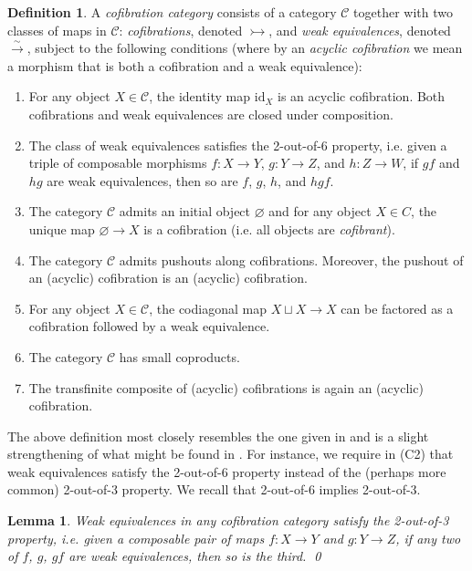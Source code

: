 \documentclass[11pt]{article}
\newtheorem{lemma}[theo]{Lemma}
\theoremstyle{definition}
\newtheorem{defi}[theo]{Definition}
\numberwithin{equation}{section}
\newcommand{\C}{\mathcal{C}}
\newcommand{\id}[1][]{\mathrm{id}_{#1}}
\newcommand{\weto}{\xrightarrow{\sim}}
\newcommand{\cto}{\rightarrowtail}
\newcommand{\from}{\colon}
\begin{document}
\begin{defi}\label{cofib-cat-def}
  A \emph{cofibration category} consists of a category $\C$ together with two classes of maps in $\C$: \emph{cofibrations}, denoted $\cto$, and \emph{weak equivalences}, denoted $\weto$, subject to the following conditions (where by an \emph{acyclic cofibration} we mean a morphism that is both a cofibration and a weak equivalence):
  \begin{enumerate}
      \item[(C1)] For any object $X \in \C$, the identity map $\id[X]$ is an acyclic cofibration.
      Both cofibrations and weak equivalences are closed under composition.
      \item[(C2)] The class of weak equivalences satisfies the 2-out-of-6 property, i.e. given a triple of composable morphisms $f \from X \to Y$, $g \from Y \to Z$, and $h \from Z \to W$, if $gf$ and $hg$ are weak equivalences, then so are $f$, $g$, $h$, and $hgf$.
      \item[(C3)] The category $\C$ admits an initial object $\varnothing$ and for any object $X \in C$, the unique map $\varnothing \to X$ is a cofibration (i.e. all objects are \emph{cofibrant}).
      \item[(C4)] The category $\C$ admits pushouts along cofibrations.
      Moreover, the pushout of an (acyclic) cofibration is an (acyclic) cofibration.
      \item[(C5)] For any object $X \in \C$, the codiagonal map $X \sqcup X \to X$ can be factored as a cofibration followed by a weak equivalence.
      \item[(C6)] The category $\C$ has small coproducts.
      \item[(C7)] The transfinite composite of (acyclic) cofibrations is again an (acyclic) cofibration.
  \end{enumerate}
\end{defi}

The above definition most closely resembles the one given in \cite{szumilo:two-models} and is a slight strengthening of what might be found in \cite{brown:abstract-homotopy-theory,baues:algebraic-homotopy}.
For instance, we require in (C2) that weak equivalences satisfy the 2-out-of-6 property instead of the (perhaps more common) 2-out-of-3 property.
We recall that 2-out-of-6 implies 2-out-of-3.

\begin{lemma}
  Weak equivalences in any cofibration category satisfy the 2-out-of-3 property, i.e. given a composable pair of maps $f \from X \to Y$ and $g \from Y \to Z$, if any two of $f$, $g$, $gf$ are weak equivalences, then so is the third. 
  \qed
\end{lemma}
\end{document}
